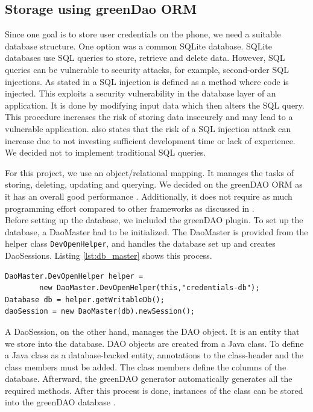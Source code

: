 

\subsection{Storage using greenDao ORM}
Since one goal is to store user credentials on the phone, we need a suitable database structure. One option was a common SQLite database. SQLite databases use SQL queries to store, retrieve and delete data. However, SQL queries can be vulnerable to security attacks, for example, second-order SQL injections. As stated in \cite{katole2018detection} a SQL injection is defined as a method where code is injected. This exploits a security vulnerability in the database layer of an application. It is done by modifying input data which then alters the SQL query. This procedure increases the risk of storing data insecurely and may lead to a vulnerable application. \cite{katole2018detection} also states that the risk of a SQL injection attack can increase due to not investing sufficient development time or lack of experience. We decided not to implement traditional SQL queries.

For this project, we use an object/relational mapping. It manages the tasks of storing, deleting, updating and querying. We decided on the greenDAO ORM as it has an overall good performance \cite{Greendao}. Additionally, it does not require as much programming effort compared to other frameworks as discussed in \cite{pu2016understanding}. \\
Before setting up the database, we included the greenDAO plugin. To set up the database, a DaoMaster had to be initialized. The DaoMaster is provided from the helper class \texttt{DevOpenHelper}, and handles the database set up and creates DaoSessions. Listing \ref{lst:db_master} shows this process.

\begin{lstlisting}[float,floatplacement=h, caption=Creation of Database, label=lst:db_master]
DaoMaster.DevOpenHelper helper = 
        new DaoMaster.DevOpenHelper(this,"credentials-db");
Database db = helper.getWritableDb();
daoSession = new DaoMaster(db).newSession();
\end{lstlisting}

A DaoSession, on the other hand, manages the DAO object. It is an entity that we store into the database. DAO objects are created from a Java class. To define a Java class as a database-backed entity, annotations to the class-header and the class members must be added. The class members define the columns of the database. Afterward, the greenDAO generator automatically generates all the required methods. After this process is done, instances of the class can be stored into the greenDAO database \cite{Greendao}.

